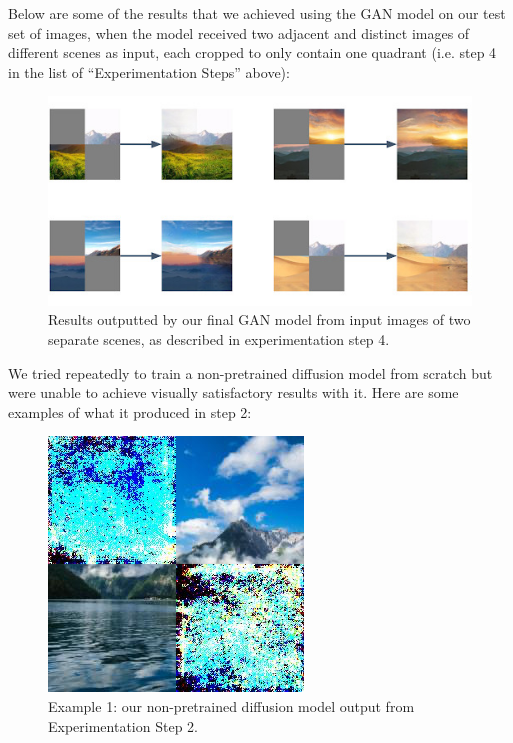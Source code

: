 \documentclass[sigconf]{acmart}
\begin{document}
Below are some of the results that we achieved using the GAN model on our test set of images, when the model received two adjacent and distinct images of different scenes as input, each cropped to only contain one quadrant (i.e. step 4 in the list of “Experimentation Steps” above):

\begin{figure}[h!]
    \centering
    \includegraphics[width=\linewidth]{gan_step_4}
    \caption{Results outputted by our final GAN model from input images of two separate scenes, as described in experimentation step 4.}
    \label{fig:gan_step_4}
\end{figure}

We tried repeatedly to train a non-pretrained diffusion model from scratch but were unable to achieve visually satisfactory results with it. Here are some examples of what it produced in step 2:

\begin{figure}[h!]
    \centering
    \includegraphics[width=\linewidth]{diffusion_step_2_1}
    \caption{Example 1: our non-pretrained diffusion model output from Experimentation Step 2.}
    \label{fig:diffusion_step_2_1}
\end{figure}
\end{document}
